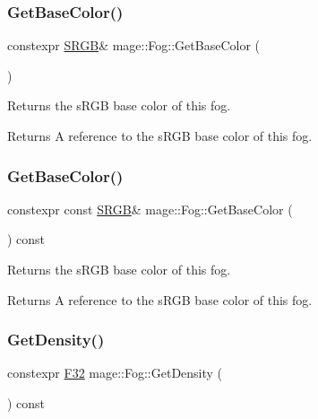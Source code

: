 \subsubsection{\texorpdfstring{Get\+Base\+Color()}{GetBaseColor()}\hspace{0.1cm}{\footnotesize\ttfamily [1/2]}}
{\footnotesize\ttfamily constexpr \hyperlink{structmage_1_1_s_r_g_b}{S\+R\+GB}\& mage\+::\+Fog\+::\+Get\+Base\+Color (\begin{DoxyParamCaption}{ }\end{DoxyParamCaption})\hspace{0.3cm}{\ttfamily [noexcept]}}

Returns the s\+R\+GB base color of this fog.

\begin{DoxyReturn}{Returns}
A reference to the s\+R\+GB base color of this fog. 
\end{DoxyReturn}
\hypertarget{classmage_1_1_fog_ac91a2ed9ac406110f2bda164fcecafbc}{}\label{classmage_1_1_fog_ac91a2ed9ac406110f2bda164fcecafbc} 
\subsubsection{\texorpdfstring{Get\+Base\+Color()}{GetBaseColor()}\hspace{0.1cm}{\footnotesize\ttfamily [2/2]}}
{\footnotesize\ttfamily constexpr const \hyperlink{structmage_1_1_s_r_g_b}{S\+R\+GB}\& mage\+::\+Fog\+::\+Get\+Base\+Color (\begin{DoxyParamCaption}{ }\end{DoxyParamCaption}) const\hspace{0.3cm}{\ttfamily [noexcept]}}

Returns the s\+R\+GB base color of this fog.

\begin{DoxyReturn}{Returns}
A reference to the s\+R\+GB base color of this fog. 
\end{DoxyReturn}
\hypertarget{classmage_1_1_fog_a6329ce07ae0167746de1aa78011e8285}{}\label{classmage_1_1_fog_a6329ce07ae0167746de1aa78011e8285} 
\subsubsection{\texorpdfstring{Get\+Density()}{GetDensity()}}
{\footnotesize\ttfamily constexpr \hyperlink{namespacemage_aa97e833b45f06d60a0a9c4fc22ae02c0}{F32} mage\+::\+Fog\+::\+Get\+Density (\begin{DoxyParamCaption}{ }\end{DoxyParamCaption}) const\hspace{0.3cm}{\ttfamily [noexcept]}}

